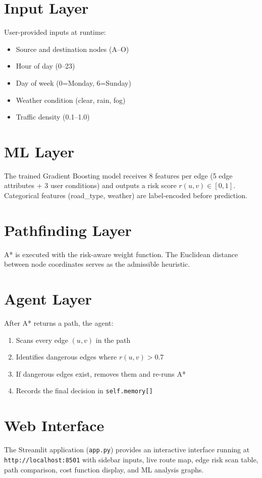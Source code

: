 \documentclass[12pt,a4paper]{report}
\begin{document}
\section{Input Layer}
User-provided inputs at runtime:
\begin{itemize}
  \item Source and destination nodes (A--O)
  \item Hour of day (0--23)
  \item Day of week (0=Monday, 6=Sunday)
  \item Weather condition (clear, rain, fog)
  \item Traffic density (0.1--1.0)
\end{itemize}

\section{ML Layer}
The trained Gradient Boosting model receives 8 features per edge (5 edge attributes + 3 user conditions) and outputs a risk score $r(u,v) \in [0, 1]$. Categorical features (road\_type, weather) are label-encoded before prediction.

\section{Pathfinding Layer}
A* is executed with the risk-aware weight function. The Euclidean distance between node coordinates serves as the admissible heuristic.

\section{Agent Layer}
After A* returns a path, the agent:
\begin{enumerate}
  \item Scans every edge $(u,v)$ in the path
  \item Identifies dangerous edges where $r(u,v) > 0.7$
  \item If dangerous edges exist, removes them and re-runs A*
  \item Records the final decision in \texttt{self.memory[]}
\end{enumerate}

\section{Web Interface}
The Streamlit application (\texttt{app.py}) provides an interactive interface running at \texttt{http://localhost:8501} with sidebar inputs, live route map, edge risk scan table, path comparison, cost function display, and ML analysis graphs.
\end{document}
